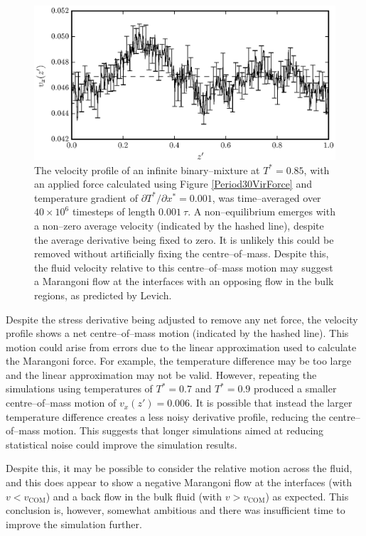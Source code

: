 \FloatBarrier
\begin{figure}[h!]
\centering
\includegraphics[scale=1.0]{Period30VirFlow}
\caption{The velocity profile of an infinite binary--mixture at $T^{*}=0.85$, with an applied force calculated using Figure \ref{Period30VirForce} and temperature gradient of $\partial T^{*} / \partial x^{*} = 0.001$, was time--averaged over $40 \times 10^{6}$ timesteps of length $0.001\ \tau$.
A non--equilibrium emerges with a non--zero average velocity (indicated by the hashed line), despite the average derivative being fixed to zero.
It is unlikely this could be removed without artificially fixing the centre--of--mass.
Despite this, the fluid velocity relative to this centre--of--mass motion may suggest a Marangoni flow at the interfaces with an opposing flow in the bulk regions, as predicted by Levich.\cite{Levich}
}
\label{Period30VirFlow}
\end{figure}

Despite the stress derivative being adjusted to remove any net force, the velocity profile shows a net centre--of--mass motion (indicated by the hashed line).
This motion could arise from errors due to the linear approximation used to calculate the Marangoni force.
For example, the temperature difference may be too large and the linear approximation may not be valid.
However, repeating the simulations using temperatures of $T^{*}=0.7$ and $T^{*}=0.9$ produced a smaller centre--of--mass motion of $v_{x}(z') = 0.006$.
It is possible that instead the larger temperature difference creates a less noisy derivative profile, reducing the centre--of--mass motion.
This suggests that longer simulations aimed at reducing statistical noise could improve the simulation results.

Despite this, it may be possible to consider the relative motion across the fluid, and this does appear to show a negative Marangoni flow at the interfaces (with $v < v_{\mathrm{COM}}$) and a back flow in the bulk fluid (with $v > v_{\mathrm{COM}}$) as expected. 
This conclusion is, however, somewhat ambitious and there was insufficient time to improve the simulation further.

